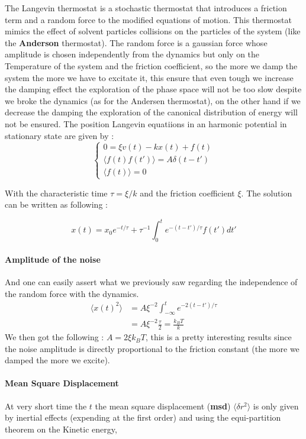 \documentclass[ansiapaper]{report}
\begin{document}
\begin{multicols}{3}
The Langevin thermostat is a stochastic thermostat that introduces a friction term and a random force to the modified equations of motion. This thermostat mimics the effect of solvent particles collisions on the particles of the system (like the \textbf{Anderson} thermostat). The random force is a gaussian force whose amplitude is chosen independently from the dynamics but only on the Temperature of the system and the friction coefficient, so the more we damp the system the more we have to excitate it, this ensure that even tough we increase the damping effect the exploration of the phase space will not be too slow despite we broke the dynamics (as for the Andersen thermostat), on the other hand if we decrease the damping the exploration of the canonical distribution of energy will not be ensured.  The position Langevin equatiions in an harmonic potential in stationary state are given by : 
$$
\begin{cases} 
0 = \xi v(t) - kx(t) + f(t)\\
\langle f(t)f(t')\rangle = A \delta(t - t')\\
\langle f(t)\rangle = 0
\end{cases} 
$$

With the characteristic time $\tau = \xi/k$ and the friction coefficient $\xi$. The solution can be written as following : 

$$ x(t) = x_0 e^{-t/\tau} + \tau^{-1}\int_{0}^{t}e^{-(t - t') / \tau} f(t')dt'$$

\paragraph*{Amplitude of the noise}
And one can easily assert what we previously saw regarding the independence of the random force with the dynamics.
\begin{align*}
    \langle x(t)^2 \rangle &= A \xi^{-2} \int_{-\infty}^{t} e^{-2(t - t')/\tau}    \\                     
                           &= A \xi^{-2} \frac{\tau}{2} = \frac{k_B T}{k} 
\end{align*}
We then got the following : $A = 2 \xi k_B T $, this is a pretty interesting results since the noise amplitude is directly proportional to the friction constant (the more we damped the more we excite).
\paragraph*{Mean Square Displacement}
At very short time the $t$ the mean square displacement (\textbf{msd}) $\langle \delta r^2\rangle$ is only given by inertial effects (expending at the first order) and using the equi-partition theorem on the Kinetic energy, 


\end{multicols}
\end{document}
